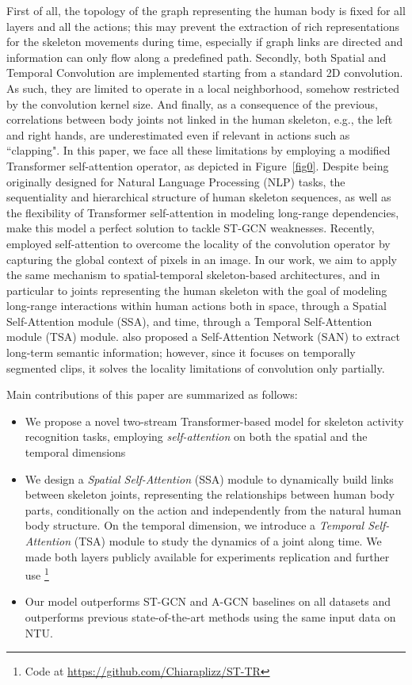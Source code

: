 \documentclass[review]{cvpr}
\begin{document}
First of all, the topology of the graph representing the human body is fixed for all layers and all the actions; this may prevent the extraction of rich representations for the skeleton movements during time, especially if graph links are directed and information can only flow along a predefined path. Secondly, both Spatial and Temporal Convolution are implemented starting from a standard 2D convolution. As such, they are limited to operate in a local neighborhood, somehow restricted by the convolution kernel size. And finally, as a consequence of the previous, correlations between body joints not linked in the human skeleton, e.g., the left and right hands, are underestimated even if relevant in actions such as ``clapping".
In this paper, we face all these limitations by employing a modified Transformer self-attention operator, as depicted in Figure~\ref{fig0}. Despite being originally designed for Natural Language Processing (NLP) tasks, the sequentiality and hierarchical structure of human skeleton sequences, as well as the flexibility of Transformer self-attention \cite{attention} in modeling long-range dependencies, make this model a perfect solution to tackle ST-GCN weaknesses. Recently, \cite{DBLP:journals/corr/abs-1904-09925} employed self-attention to overcome the locality of the convolution operator by capturing the global context of pixels in an image. In our work, we aim to apply the same mechanism to spatial-temporal skeleton-based architectures, and in particular to joints representing the human skeleton with the goal of modeling long-range interactions within human actions both in space, through a Spatial Self-Attention module (SSA), and time, through a Temporal Self-Attention module (TSA) module.
\cite{san} also proposed a Self-Attention Network (SAN) to extract long-term semantic information; however, since it focuses on temporally segmented clips, it solves the locality limitations of convolution only partially. 

Main contributions of this paper are summarized as follows: 
\begin{itemize}
    \item We propose a novel two-stream Transformer-based model for skeleton activity recognition tasks, employing \textit{self-attention} on both the spatial and the temporal dimensions
    \item We design a \textit{Spatial Self-Attention} (SSA) module to dynamically build links between skeleton joints, representing the relationships between human body parts, conditionally on the action and independently from the natural human body structure. On the temporal dimension, we introduce a  \textit{Temporal Self-Attention} (TSA) module to study the dynamics of a joint along time. We made both layers publicly available for experiments replication and further use \footnote{Code at \color{magenta}\url{https://github.com/Chiaraplizz/ST-TR}}
\item Our model outperforms ST-GCN \cite{yan2018spatial} and A-GCN \cite{Shi2018TwoStreamAG} baselines on all datasets and outperforms previous state-of-the-art methods using the same input data on NTU.
\end{itemize}
\end{document}
